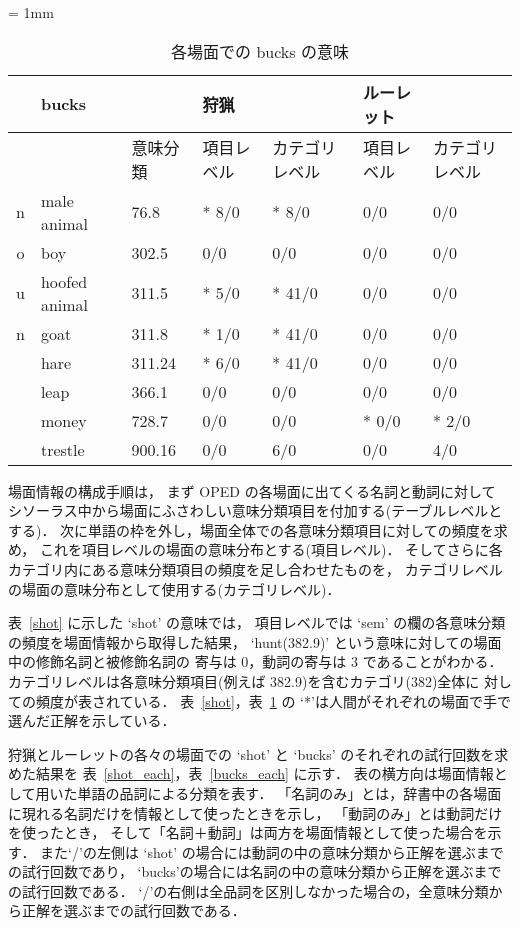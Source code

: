 \small
\begin{table}
  \caption{各場面での bucks の意味}
  \label{bucks}
  \begin{center}
    \tabcolsep = 1mm
    \begin{tabular}{|c|l|l||l|l||l|l|} \hline
      & bucks      &          & 狩猟 & & ルーレット & \\ \hline
      &            & 意味分類 & 項目レベル & カテゴリレベル & 項目レベル & カテゴリレベル \\ \hline \hline
    n & male animal & 76.8  &* 8/0 &* 8/0 & 0/0 & 0/0 \\
    o & boy        & 302.5  & 0/0 & 0/0 & 0/0 & 0/0 \\
    u & hoofed animal & 311.5 &* 5/0 &* 41/0 & 0/0 & 0/0 \\
    n & goat       & 311.8  &* 1/0  &* 41/0 & 0/0 & 0/0 \\
      & hare       & 311.24 &* 6/0  &* 41/0 & 0/0 & 0/0 \\
      & leap       & 366.1  & 0/0  & 0/0  & 0/0 & 0/0 \\
      & money      & 728.7  & 0/0  & 0/0  &* 0/0 &* 2/0 \\
      & trestle    & 900.16 & 0/0  & 6/0 & 0/0 & 4/0 \\ \hline
    \end{tabular}
  \end{center}
  \vspace{-2mm}
\end{table}
\normalsize

場面情報の構成手順は，
まず OPED の各場面に出てくる名詞と動詞に対して
シソーラス中から場面にふさわしい意味分類項目を付加する(テーブルレベルとする)．
次に単語の枠を外し，場面全体での各意味分類項目に対しての頻度を求め，
これを項目レベルの場面の意味分布とする(項目レベル)．
そしてさらに各カテゴリ内にある意味分類項目の頻度を足し合わせたものを，
カテゴリレベルの場面の意味分布として使用する(カテゴリレベル)．

表~\ref{shot} に示した `shot' の意味では，
項目レベルでは `sem' の欄の各意味分類の頻度を場面情報から取得した結果，
`hunt(382.9)' という意味に対しての場面中の修飾名詞と被修飾名詞の
寄与は 0，動詞の寄与は 3 であることがわかる．
カテゴリレベルは各意味分類項目(例えば 382.9)を含むカテゴリ(382)全体に
対しての頻度が表されている．
表~\ref{shot}，表~\ref{bucks} の
`*'は人間がそれぞれの場面で手で選んだ正解を示している．


狩猟とルーレットの各々の場面での
`shot' と `bucks' のそれぞれの試行回数を求めた結果を
表~\ref{shot_each}，表~\ref{bucks_each}
に示す．
表の横方向は場面情報として用いた単語の品詞による分類を表す．
「名詞のみ」とは，辞書中の各場面に現れる名詞だけを情報として使ったときを示し，
「動詞のみ」とは動詞だけを使ったとき，
そして「名詞＋動詞」は両方を場面情報として使った場合を示す．
また`/'の左側は `shot' の場合には動詞の中の意味分類から正解を選ぶまでの試行回数であり，
`bucks'の場合には名詞の中の意味分類から正解を選ぶまでの試行回数である．
`/'の右側は全品詞を区別しなかった場合の，全意味分類から正解を選ぶまでの試行回数である．


